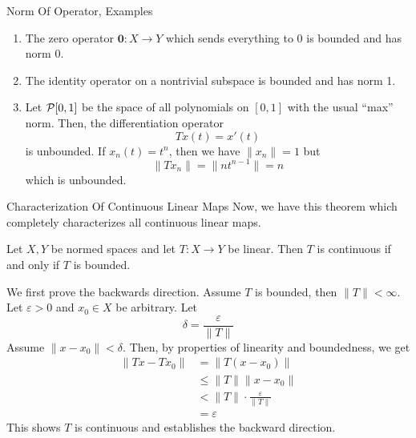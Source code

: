 \documentclass[10pt]{beamer}
\begin{document}
		\begin{frame}{Norm Of Operator, Examples}
				\begin{enumerate}
						\item<1-> The zero operator $\mathbf{0} : X\to Y$ which sends everything to 0 is bounded and has norm 0. 
						\item<2-> The identity operator on a nontrivial subspace is bounded and has norm 1. 
						\item<3-> Let $\mathcal{P}[0, 1]$ be the space of all polynomials on $[0, 1]$ with the usual ``max'' norm. Then, the differentiation operator 
								\begin{equation*}
										Tx(t) = x'(t)
								\end{equation*}
								is unbounded. If $x_n(t) = t^n$, then we have $\|x_n\| = 1$ but 
								\begin{equation*}
										\|Tx_n\| = \|nt^{n-1}\| = n
								\end{equation*}
								which is unbounded.
				\end{enumerate}
		\end{frame}

		\begin{frame}{Characterization Of Continuous Linear Maps}
				\small
				Now, we have this theorem which completely characterizes all continuous linear maps. 
				\begin{theorem}[]
						Let $X,Y$ be normed spaces and let $T: X\to Y$ be linear. Then $T$ is continuous if and only if $T$ is bounded.
				\end{theorem}
				We first prove the backwards direction. Assume $T$ is bounded, then $\|T\| < \infty$. Let $\varepsilon > 0$ and $x_0\in X$ be arbitrary. Let 
				\begin{equation*}
						\delta = \frac{\varepsilon}{\|T\|}
				\end{equation*}
				Assume $\|x - x_0\| < \delta$. Then, by properties of linearity and boundedness, we get 
				\begin{align*}
						\|Tx - Tx_0\| &= \|T(x - x_0)\| \\ 
													&\leq \|T\|\|x - x_0\| \\ 
													&< \|T\| \cdot \frac{\varepsilon}{\|T\|} \\ 
													&= \varepsilon
				\end{align*}
				This shows $T$ is continuous and establishes the backward direction.
		\end{frame}
\end{document}
